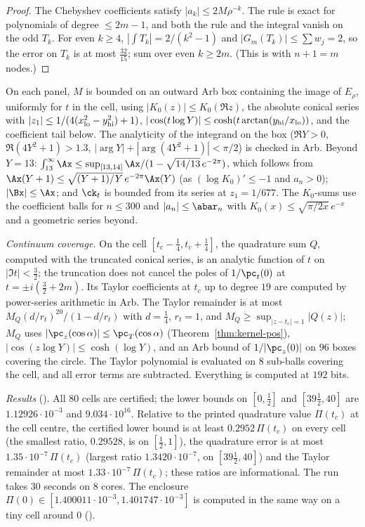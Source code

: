 \begin{proof}
The Chebyshev coefficients satisfy $|a_k|\le2M\rho^{-k}$. The rule is exact for polynomials of degree $\le2m-1$, and both the rule and the integral
vanish on the odd $T_k$. For even $k\ge4$, $|\int T_k|=2/(k^2-1)$ and $|G_m(T_k)|\le\sum w_j=2$, so the error on $T_k$ is at most $\frac{32}{15}$; sum
over even $k\ge2m$. (This is \cite[Theorem~19.3]{Tre13} with $n+1=m$ nodes.)
\end{proof}

On each panel, $M$ is bounded on an outward Arb box containing the image of $E_\rho$, uniformly for $t$ in the cell, using $|K_0(z)|\le K_0(\Re z)$,
the absolute conical series with $|z_1|\le1/(4(x_{\rm lo}^2-y_{\rm hi}^2)+1)$, $|\cos(t\log Y)|\le\cosh(t\arctan(y_{\rm hi}/x_{\rm lo}))$, and the
coefficient tail below. The analyticity of the integrand on the box ($\Re Y>0$, $\Re(4Y^2+1)>1.3$, $|\arg Y|+|\arg(4Y^2+1)|<\pi/2$) is checked in Arb.
Beyond $Y=13$: $\int_{13}^\infty\Ax\le\sup_{[13,14]}\Ax/(1-\sqrt{14/13}\,e^{-2\pi})$, which follows from $\Ax(Y+1)\le\sqrt{(Y+1)/Y}\,e^{-2\pi}\Ax(Y)$ (as
$(\log K_0)'\le-1$ and $a_n>0$); $|\Bx|\le\Ax$; and $\ck_t$ is bounded from its series at $z_1=1/677$. The $K_0$-sums use the coefficient balls for
$n\le300$ and $|a_n|\le\abar_n$ with $K_0(x)\le\sqrt{\pi/2x}\,e^{-x}$ and a geometric series beyond.

\emph{Continuum coverage.} On the cell $[t_c-\frac14,t_c+\frac14]$, the quadrature sum $Q$, computed with the truncated conical series, is an analytic
function of $t$ on $|\Im t|<\frac32$; the truncation does not cancel the poles of $1/\pc_t(0)$ at $t=\pm i(\frac32+2m)$. Its Taylor coefficients
at $t_c$ up to degree $19$ are computed by power-series arithmetic in Arb. The Taylor remainder is at most $M_Q(d/r_t)^{20}/(1-d/r_t)$ with
$d=\frac14$, $r_t=1$, and $M_Q\ge\sup_{|z-t_c|=1}|Q(z)|$; $M_Q$ uses $|\pc_z(\cos\alpha)|\le\pc_T(\cos\alpha)$ (Theorem~\ref{thm:kernel-pos}),
$|\cos(z\log Y)|\le\cosh(\log Y)$, and an Arb bound of $1/|\pc_z(0)|$ on $96$ boxes covering the circle. The Taylor polynomial is evaluated on $8$
sub-balls covering the cell, and all error terms are subtracted. Everything is computed at $192$ bits.

\emph{Results} (). All $80$ cells are certified; the lower bounds on $[0,\frac12]$ and $[39\frac12,40]$
are $1.12926\cdot10^{-3}$ and $9.034\cdot10^{16}$. Relative to the printed quadrature value $\Pi(t_c)$ at the cell centre, the certified
lower bound is at least $0.2952\,\Pi(t_c)$ on every cell (the smallest ratio, $0.29528$, is on $[\frac12,1]$), the quadrature error is at most
$1.35\cdot10^{-7}\,\Pi(t_c)$ (largest ratio $1.3420\cdot10^{-7}$, on $[39\frac12,40]$) and the Taylor remainder at most $1.33\cdot10^{-7}\,\Pi(t_c)$;
these ratios are informational. The run takes $30$ seconds on $8$ cores. The
enclosure $\Pi(0)\in[1.400011\cdot10^{-3},1.401747\cdot10^{-3}]$ is computed in the same way on a tiny cell around $0$
().

